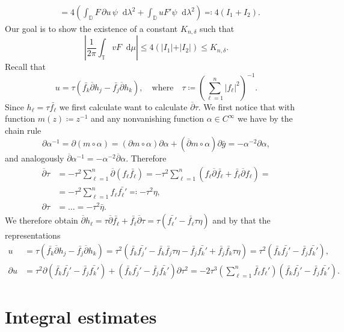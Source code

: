 \documentclass[letterpaper, 11pt]{article}
\newcommand{\D}{\mathbb{D}}
\newcommand{\T}{\mathbb{T}}
\newcommand{\1}{\mathds{1}}
\newcommand{\dd}{\mathop{}\!\mathrm{d}}
\newcommand{\wirtz}{\partial}
\newcommand{\wirtzbar}{\overline{\partial}}
\theoremstyle{definition}
\newenvironment{innerproof}
 {\renewcommand{\qedsymbol}{}\proof}
 {\endproof}
\begin{document}
\begin{innerproof}[Proof (continued)]
\begin{align*}
    &= 4 \left( \int_\D F \, \wirtz u \, \psi \dd \lambda^2 + \int_\D u F' \psi \dd \lambda^2 \right) \eqqcolon 4 (I_1 + I_2).
  \end{align*}
  Our goal is to show the existence of a constant $K_{n,\delta}$ such that
  $$ \left\vert \frac{1}{2 \pi} \int_\T v F \dd \mu \right\vert \leq 4 (\vert I_1 \vert + \vert I_2 \vert) \leq K_{n,\delta}. $$
  Recall that
  $$ u = \tau ( \bar{f_k} \wirtzbar h_j - \bar{f_j} \wirtzbar h_k), \quad \textrm{where} \quad \tau \coloneqq \left( \sum_{\ell=1}^n \vert f_\ell \vert^2 \right)^{-1}. $$
  Since $h_\ell = \tau \bar{f_\ell}$ we first calculate want to calculate $\wirtzbar \tau$. We first notice that with function $m(z) \coloneqq z^{-1}$ and any nonvanishing function $\alpha \in C^\infty$ we have by the chain rule
  $$ \wirtz \alpha^{-1} = \wirtz (m \circ \alpha) = (\wirtz m \circ \alpha) \wirtz \alpha + (\wirtzbar m \circ \alpha) \wirtz \bar{g} = -\alpha^{-2} \partial \alpha, $$
  and analogously $\wirtzbar \alpha^{-1} = -\alpha^{-2} \wirtzbar \alpha$. Therefore
  \begin{align*}
    \wirtzbar \tau &= - \tau^2 \sum_{\ell=1}^n \wirtzbar (f_\ell \bar{f_\ell}) = -\tau^2 \sum_{\ell=1}^n ( f_\ell \wirtzbar \bar{f_\ell} + \bar{f_\ell} \wirtzbar f_\ell ) = \\
    &= -\tau^2 \sum_{\ell=1}^n f_\ell \bar{f_\ell'} \eqqcolon -\tau^2 \eta, \\
    \wirtz \tau &= \dots = -\tau^2 \bar{\eta}.
  \end{align*}
  We therefore obtain $ \wirtzbar h_\ell = \tau \wirtzbar \bar{f_\ell} + \bar{f_\ell} \wirtzbar \tau = \tau ( \bar{f_\ell'} - \bar{f_\ell} \tau \eta ) $ and by that the representations
  \begin{align*}
    u &= \tau ( \bar{f_k} \wirtzbar h_j - \bar{f_j} \wirtzbar h_k) = \tau^2 ( \bar{f_k} \bar{f_j'} - \bar{f_k} \bar{f_j} \tau \eta - \bar{f_j} \bar{f_k'} + \bar{f_j} \bar{f_k} \tau \eta ) = \tau^2 ( \bar{f_k} \bar{f_j'} - \bar{f_j} \bar{f_k'} ), \\
    \partial u &= \tau^2 \partial ( \bar{f_k} \bar{f_j'} - \bar{f_j} \bar{f_k'} ) + ( \bar{f_k} \bar{f_j'} - \bar{f_j} \bar{f_k'} ) \partial \tau^2 = -2 \tau^3 \left( \sum_{\ell=1}^n \bar{f_\ell} f_\ell' \right) ( \bar{f_k} \bar{f_j'} - \bar{f_j} \bar{f_k'} ).
  \end{align*}
\end{innerproof}

\section{Integral estimates}
\end{document}

